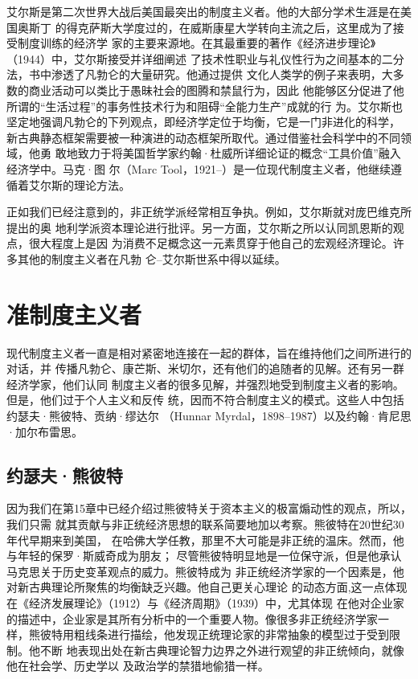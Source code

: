艾尔斯是第二次世界大战后美国最突出的制度主义者。他的大部分学术生涯是在美国奥斯丁
的得克萨斯大学度过的，在威斯康星大学转向主流之后，这里成为了接受制度训练的经济学
家的主要来源地。在其最重要的著作《经济进步理论》（1944）中，艾尔斯接受并详细阐述
了技术性职业与礼仪性行为之间基本的二分法，书中渗透了凡勃仑的大量研究。他通过提供
文化人类学的例子来表明，大多数的商业活动可以类比于愚昧社会的图腾和禁鼠行为，因此
他能够区分促进了他所谓的“生活过程”的事务性技术行为和阻碍“全能力生产”成就的行
为。艾尔斯也坚定地强调凡勃仑的下列观点，即经济学定位于均衡，它是一门非进化的科学，
新古典静态框架需要被一种演进的动态框架所取代。通过借鉴社会科学中的不同领域，他勇
敢地致力于将美国哲学家约翰·杜威所详细论证的概念“工具价值”融入经济学中。马克·图
尔（Marc Tool，1921--）是一位现代制度主义者，他继续遵循着艾尔斯的理论方法。

正如我们已经注意到的，非正统学派经常相互争执。例如，艾尔斯就对庞巴维克所提出的奥
地利学派资本理论进行批评。另一方面，艾尔斯之所以认同凯恩斯的观点，很大程度上是因
为消费不足概念这一元素贯穿于他自己的宏观经济理论。许多其他的制度主义者在凡勃
仑--艾尔斯世系中得以延续。

\section{准制度主义者}

现代制度主义者一直是相对紧密地连接在一起的群体，旨在维持他们之间所进行的对话，并
传播凡勃仑、康芒斯、米切尔，还有他们的追随者的见解。还有另一群经济学家，他们认同
制度主义者的很多见解，并强烈地受到制度主义者的影响。但是，他们过于个人主义和反传
统，因而不符合制度主义的模式。这些人中包括约瑟夫·熊彼特、贡纳·缪达尔
（Hunnar Myrdal，1898--1987）以及约翰·肯尼思·加尔布雷思。

\subsection{约瑟夫·熊彼特}

因为我们在第15章中已经介绍过熊彼特关于资本主义的极富煽动性的观点，所以，我们只需
就其贡献与非正统经济思想的联系简要地加以考察。熊彼特在20世纪30年代早期来到美国，
在哈佛大学任教，那里不大可能是非正统的温床。然而，他与年轻的保罗·斯威奇成为朋友；
尽管熊彼特明显地是一位保守派，但是他承认马克思关于历史变革观点的威力。熊彼特成为
非正统经济学家的一个因素是，他对新古典理论所聚焦的均衡缺乏兴趣。他自己更关心理论
的动态方面,这一点体现在《经济发展理论》（1912）与《经济周期》（1939）中，尤其体现
在他对企业家的描述中，企业家是其所有分析中的一个重要人物。像很多非正统经济学家一
样，熊彼特用粗线条进行描绘，他发现正统理论家的非常抽象的模型过于受到限制。他不断
地表现出处在新古典理论智力边界之外进行观望的非正统倾向，就像他在社会学、历史学以
及政治学的禁猎地偷猎一样。

